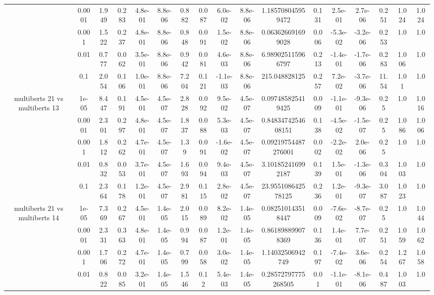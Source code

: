 \begin{tabular}{|c|c|c|c|c|c|c|c|c|c|c|c|c|c|c|c|c|}
 & 0.0001 & 1.949 & 0.283 & 4.8e-01 & 8.8e-06 & 0.882 & 0.087 & 6.0e-02 & 8.8e-06 & 1.185708045959472 & 0.131 & 2.5e-01 & 2.7e-06 & 0.251 & 1.024 & 1.024 \\
 & 0.001 & 1.522 & 0.237 & 4.8e-01 & 8.8e-06 & 0.848 & 0.091 & 1.5e-02 & 8.8e-06 & 0.063626691699028 & 0.006 & -5.3e-02 & -3.2e-06 & 0.253 & 1.0 & 1.0 \\
 & 0.01 & 0.777 & 0.062 & 3.5e-01 & 8.8e-06 & 0.942 & 0.081 & 4.6e-03 & 8.8e-06 & 6.989025115966797 & 0.213 & -1.4e-01 & -1.7e-06 & 0.283 & 1.006 & 1.0 \\
 & 0.1 & 2.054 & 0.106 & 1.0e-01 & 8.8e-06 & 7.204 & 0.121 & -1.1e-03 & 8.8e-06 & 215.048828125 & 0.257 & 7.2e-02 & -3.7e-06 & 11.54 & 1.01 & 1.0 \\
\hline
\multirow{5}{*}{multiberts 21 vs multiberts 13} & 1e-05 & 8.447 & 0.191 & 4.5e-01 & 4.5e-07 & 2.828 & 0.092 & 9.5e-02 & 4.5e-07 & 0.097485825419425 & 0.009 & -1.1e-01 & -9.3e-06 & 0.25 & 1.0 & 1.016 \\
 & 0.0001 & 2.301 & 0.297 & 4.8e-01 & 4.5e-07 & 1.837 & 0.088 & 5.3e-03 & 4.5e-07 & 0.8483474254608151 & 0.138 & -4.5e-02 & -1.5e-07 & 0.25 & 1.086 & 1.006 \\
 & 0.001 & 1.812 & 0.262 & 4.7e-01 & 4.5e-07 & 1.39 & 0.091 & -1.6e-02 & 4.5e-07 & 0.09219754487276001 & 0.002 & -2.2e-02 & 2.0e-06 & 0.25 & 1.0 & 1.0 \\
 & 0.01 & 0.832 & 0.053 & 3.7e-01 & 4.5e-07 & 1.693 & 0.094 & 9.4e-03 & 4.5e-07 & 3.101852416992187 & 0.139 & 1.5e-01 & -1.3e-06 & 0.304 & 1.003 & 1.0 \\
 & 0.1 & 2.364 & 0.178 & 1.2e-01 & 4.5e-07 & 2.981 & 0.115 & 2.8e-02 & 4.5e-07 & 23.955108642578125 & 0.236 & 1.2e-01 & -9.3e-07 & 3.087 & 1.023 & 1.0 \\
\hline
\multirow{5}{*}{multiberts 21 vs multiberts 14} & 1e-05 & 7.369 & 0.267 & 4.5e-01 & 1.4e-05 & 2.015 & 0.089 & 8.2e-02 & 1.4e-05 & 0.082510143518447 & 0.009 & -7.6e-02 & -8.7e-07 & 0.25 & 1.0 & 1.044 \\
 & 0.0001 & 2.331 & 0.363 & 4.8e-01 & 1.4e-05 & 0.994 & 0.087 & 1.2e-01 & 1.4e-05 & 0.861898899078369 & 0.136 & 1.4e-01 & 7.7e-07 & 0.251 & 1.059 & 1.062 \\
 & 0.001 & 1.706 & 0.272 & 4.7e-01 & 1.4e-05 & 0.799 & 0.058 & 3.0e-02 & 1.4e-05 & 1.14032506942749 & 0.197 & -7.4e-02 & 3.6e-06 & 0.254 & 1.267 & 1.058 \\
 & 0.01 & 0.822 & 0.085 & 3.2e-01 & 1.4e-05 & 1.546 & 0.12 & 5.4e-03 & 1.4e-05 & 0.28572797775268505 & 0.01 & -1.1e-01 & -8.1e-06 & 0.487 & 1.003 & 1.0 \\

\end{tabular}
